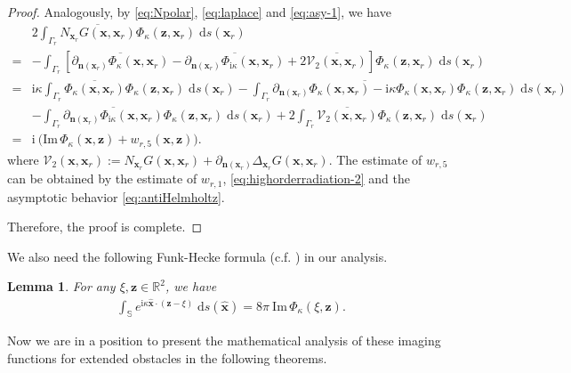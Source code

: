 \documentclass[10pt,a4paper]{article}
\numberwithin{equation}{section}
\newtheorem{lemma}[theorem]{Lemma}
\begin{document}
\begin{proof}
   Analogously, by \eqref{eq:Npolar}, \eqref{eq:laplace} and \eqref{eq:asy-1}, 
   we have
   \begin{align*}
     & 2 \int_{ \Gamma_{r} }\overline{N_{\bm{ x }_r} G(\bm{ x },\bm{ x }_r)}\Phi_{\kappa}(\bm{ z },\bm{ x }_r) \;\mathrm{d}s(\bm{ x }_r)\\
     =&  - \int_{ \Gamma_r } \left[ \overline{ \partial_{\bm{n}(\bm{ x }_r) }\Phi_{\kappa}(\bm{ x },\bm{ x }_r)}
        - \overline{ \partial_{\bm{n}(\bm{ x }_r) }\Phi_{\mathrm{ i }\kappa}(\bm{ x },\bm{ x }_r)}     + 2 \overline{\mathcal{V}_2(\bm{ x },\bm{ x }_r)} \right]
        \Phi_{\kappa}(\bm{ z },\bm{ x }_r) \;\mathrm{d}s(\bm{ x }_r)\\
     = & \mathrm{ i } \kappa \int_{ \Gamma_{r} }\overline{ \Phi_{\kappa}(\bm{ x },\bm{ x }_r)}\Phi_{\kappa}(\bm{ z },\bm{ x }_r) \;\mathrm{d}s(\bm{ x }_r)
         -   \int_{ \Gamma_{r} }\overline{ \partial_{\bm{n}(\bm{ x }_r) }\Phi_{\kappa}(\bm{ x },\bm{ x }_r) - \mathrm{ i } \kappa\Phi_{\kappa}(\bm{ x },\bm{ x }_r)}\Phi_{\kappa}(\bm{ z },\bm{ x }_r) \;\mathrm{d}s(\bm{ x }_r) \\
     &     -  \int_{ \Gamma_{r} }\overline{ \partial_{\bm{n}(\bm{ x }_r) }\Phi_{\mathrm{ i }\kappa}(\bm{ x },\bm{ x }_r)}\Phi_{\kappa}(\bm{ z },\bm{ x }_r) \;\mathrm{d}s(\bm{ x }_r)
    +  2\int_{ \Gamma_{r} }\overline{ \mathcal{V}_2(\bm{ x },\bm{ x }_r)} \Phi_{\kappa}(\bm{ z },\bm{ x }_r) \;\mathrm{d}s(\bm{ x }_r) \\
     = &   \mathrm{ i } ~ \big(  \mathrm{Im}\, \Phi_{\kappa} (\bm{ x }, \bm{ z }) + w_{r,5} (\bm{ x }, \bm{ z }) \big).
   \end{align*}
   where  $\mathcal{V}_2(\bm{ x },\bm{ x }_r):=N_{\bm{ x }_r} G(\bm{ x },\bm{ x }_r)
        +\partial_{\bm{n}(\bm{ x }_{r})} \Delta_{\bm{ x }_r}G(\bm{ x },\bm{ x }_r)$.
The estimate of $w_{r,5}$ can be obtained by the estimate of $w_{r,1}$, \eqref{eq:highorderradiation-2} and
the asymptotic behavior \eqref{eq:antiHelmholtz}.

   Therefore, the proof is complete.
\end{proof}

We also need the following Funk-Hecke formula (c.f. \cite[Lemma 2.7]{liu_novel_2017}) in our analysis.
\begin{lemma}
  \label{lem:plane}
  For any $\xi, \bm{ z } \in  \mathbb{R}^2$, we have
  \begin{align}
    \label{eq:plane}
    \int_{ \mathbb{S}  } e^{\mathrm{ i } \kappa \hat{\bm x}\cdot(\bm{ z }-\xi)}\;\mathrm{d}s( \hat{\bm x})
    = 8\pi ~ \mathrm{Im}\,\Phi_{\kappa}(\xi,\bm{ z }).
  \end{align}
\end{lemma}
Now we are in a position to  present the mathematical analysis of these imaging functions for  extended obstacles in the following theorems.
\end{document}
